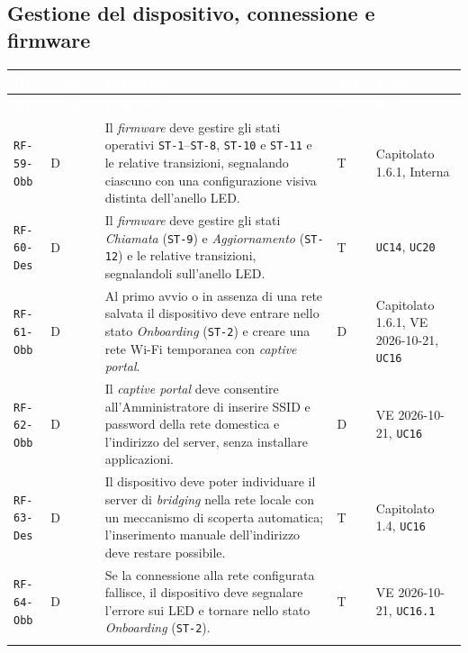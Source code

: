 \documentclass[12pt,a4paper]{article}
\newcommand{\thc}[1]{\textcolor{white}{\textbf{#1}}}
\newcommand{\rl}{\\ \arrayrulecolor{bfline}\hline}
\begin{document}
\subsection{Gestione del dispositivo, connessione e firmware}
\begin{longtable}{>{\raggedright\arraybackslash}p{}>{\centering\arraybackslash}p{}>{\raggedright\arraybackslash}p{}>{\centering\arraybackslash}p{}>{\raggedright\arraybackslash}p{}}
\rowcolor{bfblue}\thc{ID} & \thc{Comp.} & \thc{Requisito} & \thc{Ver.} & \thc{Fonti} \\ \endfirsthead
\rowcolor{bfblue}\thc{ID} & \thc{Comp.} & \thc{Requisito} & \thc{Ver.} & \thc{Fonti} \\ \endhead
\texttt{RF-59-Obb} & D & Il \emph{firmware} deve gestire gli stati operativi \texttt{ST-1}--\texttt{ST-8}, \texttt{ST-10} e \texttt{ST-11} e le relative transizioni, segnalando ciascuno con una configurazione visiva distinta dell'anello LED. & T & Capitolato 1.6.1, Interna \rl

\texttt{RF-60-Des} & D & Il \emph{firmware} deve gestire gli stati \emph{Chiamata} (\texttt{ST-9}) e \emph{Aggiornamento} (\texttt{ST-12}) e le relative transizioni, segnalandoli sull'anello LED. & T & \texttt{UC14}, \texttt{UC20} \rl

\texttt{RF-61-Obb} & D & Al primo avvio o in assenza di una rete salvata il dispositivo deve entrare nello stato \emph{Onboarding} (\texttt{ST-2}) e creare una rete Wi-Fi temporanea con \emph{captive portal}. & D & Capitolato 1.6.1, VE 2026-10-21, \texttt{UC16} \rl

\texttt{RF-62-Obb} & D & Il \emph{captive portal} deve consentire all'Amministratore di inserire SSID e password della rete domestica e l'indirizzo del server, senza installare applicazioni. & D & VE 2026-10-21, \texttt{UC16} \rl

\texttt{RF-63-Des} & D & Il dispositivo deve poter individuare il server di \emph{bridging} nella rete locale con un meccanismo di scoperta automatica; l'inserimento manuale dell'indirizzo deve restare possibile. & T & Capitolato 1.4, \texttt{UC16} \rl

\texttt{RF-64-Obb} & D & Se la connessione alla rete configurata fallisce, il dispositivo deve segnalare l'errore sui LED e tornare nello stato \emph{Onboarding} (\texttt{ST-2}). & T & VE 2026-10-21, \texttt{UC16.1} \rl


\end{longtable}
\end{document}
